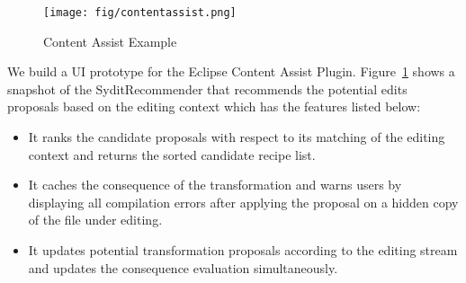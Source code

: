 %
%
%
%
%
%
%
%
%
%
%




\begin{figure}[ht]
\centering
\texttt{[image: fig/contentassist.png]}
\caption{Content Assist Example}
\label{fig:assist}
\end{figure}

We build a UI prototype for the Eclipse Content Assist Plugin. Figure~\ref{fig:assist} shows a snapshot of the SyditRecommender that recommends the potential edits proposals based on the editing context which has the features listed below:
 \begin{itemize}
 \item It ranks the candidate proposals with respect to its matching of the editing context and returns the sorted candidate recipe list.
 \item It caches the consequence of the transformation and warns users by displaying all compilation errors after applying the proposal on a hidden copy of the file under editing.
 \item It updates potential transformation proposals according to the editing stream and updates the consequence evaluation simultaneously.
 \end{itemize}

